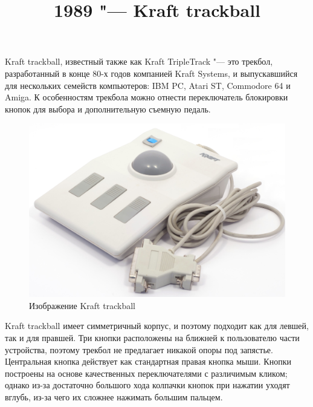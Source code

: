 \documentclass[11pt, a4paper]{article}
\begin{document}
\title{1989 "--- Kraft trackball}
\date{}
\maketitle
{}
Kraft trackball, известный также как Kraft TripleTrack \cite{triple} "---	 это трекбол, разработанный в конце 80-х годов компанией Kraft Systems, и выпускавшийся для нескольких семейств компьютеров: IBM PC, Atari ST, Commodore 64 и Amiga. К особенностям трекбола можно отнести переключатель блокировки кнопок для выбора и дополнительную съемную педаль.

\begin{figure}[h]
    \centering
    \includegraphics[scale=0.4]{1989_kraft_trackball/pic_30.jpg}
    \caption{Изображение Kraft trackball}
    \label{fig:KraftPhoto}
\end{figure}

Kraft trackball имеет симметричный корпус, и поэтому подходит как для левшей, так и для правшей. Три кнопки расположены на ближней к пользователю части устройства, поэтому трекбол не предлагает никакой опоры под запястье. Центральная кнопка действует как стандартная правая кнопка мыши. Кнопки построены на основе качественных переключателями с различимым кликом; однако из-за достаточно большого хода колпачки кнопок при нажатии уходят вглубь, из-за чего их сложнее нажимать большим пальцем.
\end{document}
